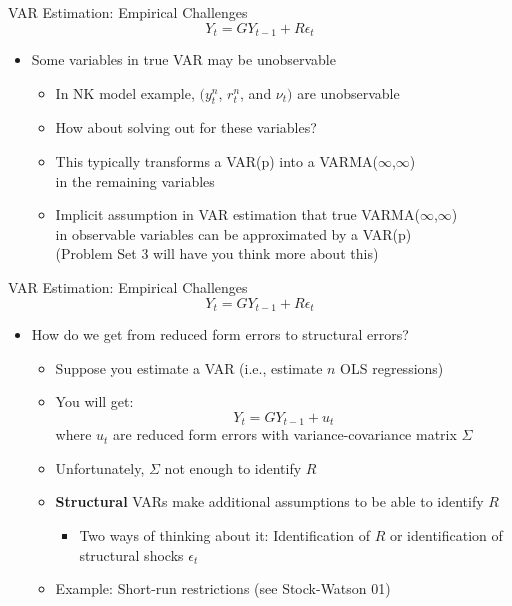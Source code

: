 \documentclass[11pt,aspectratio=169,xcolor={dvipsnames},hyperref={pdftex,pdfpagemode=UseNone,hidelinks,pdfdisplaydoctitle=true},usepdftitle=false]{beamer}
\begin{document}
\begin{frame}{VAR Estimation: Empirical Challenges}
\[ Y_{t} = G Y_{t-1} + R \epsilon_{t} \]
\begin{itemize}
\item Some variables in true VAR may be unobservable
\begin{itemize}
\item In NK model example, $(y_{t}^{n}$, $r_{t}^{n}$, and $\nu_{t})$ are unobservable
\item How about solving out for these variables?
\item This typically transforms a VAR(p) into a VARMA($\infty$,$\infty$) \\ in the remaining variables
\item Implicit assumption in VAR estimation that true VARMA($\infty$,$\infty$) \\ in observable variables can be approximated by a VAR(p) \\ {\footnotesize (Problem Set 3 will have you think more about this)}
\end{itemize}
\end{itemize}

\end{frame}


\begin{frame}{VAR Estimation: Empirical Challenges}
\[ Y_{t} = G Y_{t-1} + R \epsilon_{t} \]
\begin{itemize}
\setcounter{enumi}{1}
\item How do we get from reduced form errors to structural errors?
\begin{itemize}
\item Suppose you estimate a VAR (i.e., estimate $n$ OLS regressions) 
\item You will get:
\[ Y_{t} = G Y_{t-1} + u_{t} \]
where $u_{t}$ are reduced form errors with variance-covariance matrix $\Sigma$
\item Unfortunately, $\Sigma$ not enough to identify $R$
\item \textbf{Structural} VARs make additional assumptions to be able to identify $R$
\begin{itemize}
	\item Two ways of thinking about it: Identification of $R$ or identification of structural shocks $\epsilon_{t}$
\end{itemize}
\item Example: Short-run restrictions {\footnotesize (see Stock-Watson 01)}
\end{itemize}
\end{itemize}
\end{frame}
\end{document}
